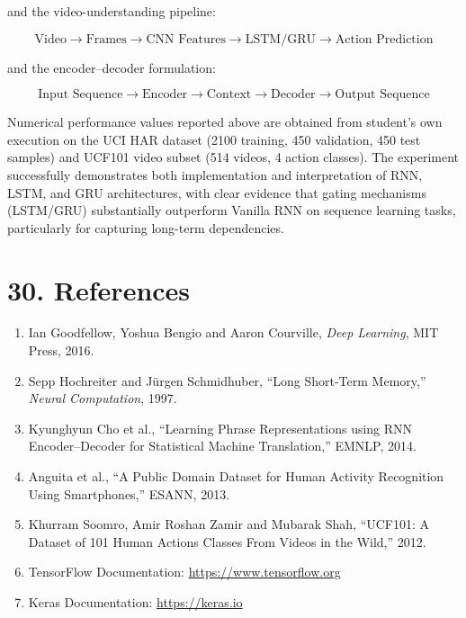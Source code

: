 \documentclass[10pt]{article}
\begin{document}
and the video-understanding pipeline:

\[
\boxed{
\text{Video}
\rightarrow
\text{Frames}
\rightarrow
\text{CNN Features}
\rightarrow
\text{LSTM/GRU}
\rightarrow
\text{Action Prediction}
}
\]

and the encoder--decoder formulation:

\[
\boxed{
\text{Input Sequence}
\rightarrow
\text{Encoder}
\rightarrow
\text{Context}
\rightarrow
\text{Decoder}
\rightarrow
\text{Output Sequence}
}
\]

Numerical performance values reported above are obtained from student's own execution on the UCI HAR 
dataset (2100 training, 450 validation, 450 test samples) and UCF101 video subset (514 videos, 
4 action classes). The experiment successfully demonstrates both implementation and interpretation of 
RNN, LSTM, and GRU architectures, with clear evidence that gating mechanisms (LSTM/GRU) substantially 
outperform Vanilla RNN on sequence learning tasks, particularly for capturing long-term dependencies.

\section*{30. References}

\begin{enumerate}
\item Ian Goodfellow, Yoshua Bengio and Aaron Courville,
\emph{Deep Learning}, MIT Press, 2016.

\item Sepp Hochreiter and Jürgen Schmidhuber,
``Long Short-Term Memory,'' \emph{Neural Computation}, 1997.

\item Kyunghyun Cho et al.,
``Learning Phrase Representations using RNN Encoder--Decoder for Statistical Machine Translation,'' EMNLP, 2014.

\item Anguita et al.,
``A Public Domain Dataset for Human Activity Recognition Using Smartphones,''
ESANN, 2013.

\item Khurram Soomro, Amir Roshan Zamir and Mubarak Shah,
``UCF101: A Dataset of 101 Human Actions Classes From Videos in the Wild,''
2012.

\item TensorFlow Documentation:
\url{https://www.tensorflow.org}

\item Keras Documentation:
\url{https://keras.io}
\end{enumerate}
\end{document}
